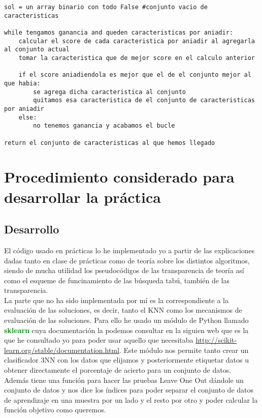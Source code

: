 \documentclass[10pt,a4paper]{article}
\begin{document}
\begin{lstlisting}
sol = un array binario con todo False #conjunto vacio de caracteristicas

while tengamos ganancia and queden caracteristicas por aniadir:
	calcular el score de cada caracteristica por aniadir al agregarla al conjunto actual
	tomar la caracteristica que de mejor score en el calculo anterior
	
	if el score aniadiendola es mejor que el de el conjunto mejor al que habia:
		se agrega dicha caracteristica al conjunto
		quitamos esa caracteristica de el conjunto de caracteristicas por aniadir
	else:
		no tenemos ganancia y acabamos el bucle
		
return el conjunto de caracteristicas al que hemos llegado
\end{lstlisting}
\newpage
\section{\color[rgb]{0.0,0.0,0.21}Procedimiento considerado para desarrollar la práctica}

\subsection{\color[rgb]{0.0,0.0,0.51}Desarrollo}

El código usado en prácticas lo he implementado yo a partir de las explicaciones dadas tanto en clase de prácticas como de teoría sobre los distintos algoritmos, siendo de mucha utilidad los pseudocódigos de las transparencia de teoría así como el esqueme de funcinamiento de las búsqueda tabú, también de las transparencia.\\

La parte que no ha sido implementada por mí es la correspondiente a la evaluación de las soluciones, es decir, tanto el KNN como los mecanismos de evaluación de las soluciones. Para ello he usado un módulo de Python llamado \textbf{\textcolor{green}{sklearn}} cuya documentación la podemos consultar en la siguien web que es la que he consultado yo para poder usar aquello que necesitaba \url{http://scikit-learn.org/stable/documentation.html}. Este módulo nos permite tanto crear un clasificador 3NN con los datos que elijamos y posteriormente etiquetar datos u obtener directamente el porcentaje de acierto para un conjunto de datos.\\

Además tiene una función para hacer las pruebas Leave One Out dándole un conjunto de datos y nos dice los índices para poder separar el conjunto de datos de aprendizaje en una muestra por un lado y el resto por otro y poder calcular la función objetivo como queremos.\\
\end{document}

